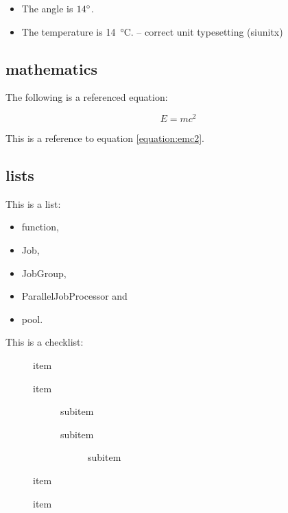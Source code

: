 \begin{itemize}
\item The angle is ${14\degree}$.
\item The temperature is \SI{14}{\celsius}. -- correct unit typesetting (siunitx)
\end{itemize}

\subsection{mathematics}

The following is a referenced equation:

\begin{equation}
\label{equation:emc2}
E=mc^{2}
\end{equation}

This is a reference to equation \ref{equation:emc2}.

\subsection{lists}

This is a list:

\begin{itemize}
\item function,
\item Job,
\item JobGroup,
\item ParallelJobProcessor and
\item pool.
\end{itemize}

\newpage

This is a checklist:

\begin{description}
\item[\Checkmark] item
\item[\Checkmark] item
    \begin{description}
    \item[\Checkmark] subitem
    \item[\Checkmark] subitem
        \begin{description}
        \item[\Checkmark] subitem
        \end{description}
    \end{description}
\item[\Checkmark] item
\item[\XSolidBrush] item
\end{description}

